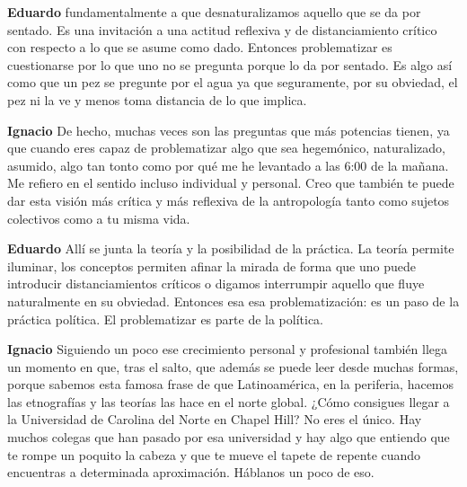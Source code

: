 \documentclass[
  spanish,
  11pt,
  a4paper,
]{scrbook}
\newenvironment{transcripcion}{
    \begin{list}{}{
        \setlength{\leftmargin}{1.5em}  %
        \setlength{\rightmargin}{0em}
        \setlength{\itemsep}{0.2em}     %
        \setlength{\parsep}{0.0em}
        \setlength{\listparindent}{0pt}
    }
}{
    \end{list}
}
\newcommand{\personaje}[1]{\textbf{#1}\quad}
\begin{document}
\begin{transcripcion}
\item \personaje{Eduardo} fundamentalmente a que desnaturalizamos aquello que se da por sentado. Es una invitación a una actitud reflexiva y de distanciamiento crítico con respecto a lo que se asume como dado. Entonces problematizar es cuestionarse por lo que uno no se pregunta porque lo da por sentado. Es algo así como que un pez se pregunte por el agua ya que seguramente, por su obviedad, el pez ni la ve y menos toma distancia de lo que implica.

\item \personaje{Ignacio} De hecho, muchas veces son las preguntas que más potencias tienen, ya que cuando eres capaz de problematizar algo que sea hegemónico, naturalizado, asumido, algo tan tonto como por qué me he levantado a las 6:00 de la mañana. Me refiero en el sentido incluso individual y personal. Creo que también te puede dar esta visión más crítica y más reflexiva de la antropología tanto como sujetos colectivos como a tu misma vida.

\item \personaje{Eduardo} Allí se junta la teoría y la posibilidad de la práctica. La teoría permite iluminar, los conceptos permiten afinar la mirada de forma que uno puede introducir distanciamientos críticos o digamos interrumpir aquello que fluye naturalmente en su obviedad. Entonces esa esa problematización: es un paso de la práctica política. El problematizar es parte de la política.

\item \personaje{Ignacio} Siguiendo un poco ese crecimiento personal y profesional también llega un momento en que, tras el salto, que además se puede leer desde muchas formas, porque sabemos esta famosa frase de que Latinoamérica, en la periferia, hacemos las etnografías y las teorías las hace en el norte global. ¿Cómo consigues llegar a la Universidad de Carolina del Norte en Chapel Hill? No eres el único. Hay muchos colegas que han pasado por esa universidad y hay algo que entiendo que te rompe un poquito la cabeza y que te mueve el tapete de repente cuando encuentras a determinada aproximación. Háblanos un poco de eso.


\end{transcripcion}
\end{document}
